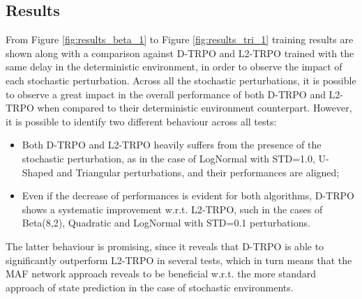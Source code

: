         \subsection{Results}
        \label{sub:stoch_env_res}
            From Figure \ref{fig:results_beta_1} to Figure \ref{fig:results_tri_1} training results are shown along with a comparison against D-TRPO and L2-TRPO trained with the same delay in the deterministic environment, in order to observe the impact of each stochastic perturbation. Across all the stochastic perturbations, it is possible to observe a great impact in the overall performance of both D-TRPO and L2-TRPO when compared to their deterministic environment counterpart. However, it is possible to identify two different behaviour across all tests:
            \begin{itemize}
                \setlength\itemsep{0.05em}
                \item Both D-TRPO and L2-TRPO heavily suffers from the presence of the stochastic perturbation, as in the case of LogNormal with STD=1.0, U-Shaped and Triangular perturbations, and their performances are aligned;
                \item Even if the decrease of performances is evident for both algorithms, D-TRPO shows a systematic improvement w.r.t. L2-TRPO, such in the cases of Beta(8,2), Quadratic and LogNormal with STD=0.1 perturbations.
            \end{itemize}
            The latter behaviour is promising, since it reveals that D-TRPO is able to significantly outperform L2-TRPO in several tests, which in turn means that the MAF network approach reveals to be beneficial w.r.t. the more standard approach of state prediction in the case of stochastic environments. 
            

